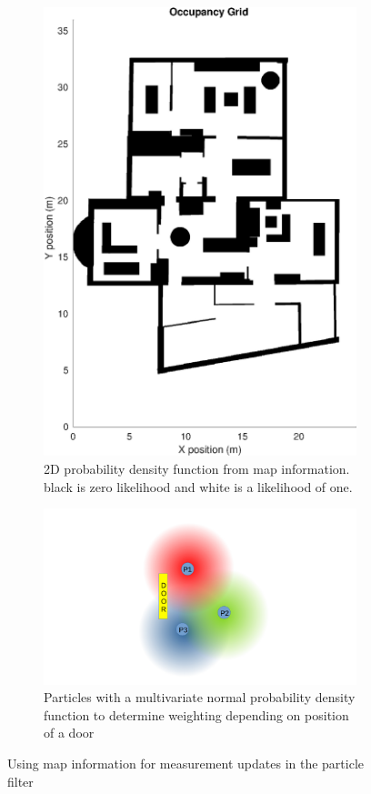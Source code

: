 \begin{enumerate}
	\begin{figure}[H]
		\centering
		\begin{subfigure}[t]{.4\textwidth}
			\centering
			\includegraphics[width=0.7\linewidth]{images/20201030_1157_pf_map_1}
			\caption{2D probability density function from map information. black is zero likelihood and white is a likelihood of one.}
			\label{fig:pf_walls}
		\end{subfigure} \quad
		\begin{subfigure}[t]{0.4\textwidth}
			\centering
			\includegraphics[trim=240 0 220 0, clip, width=0.7\linewidth]{images/pf_diagram}
			\caption{ Particles with a multivariate normal probability density function to determine weighting depending on position of a door}
			\label{fig:pfdiagram}
		\end{subfigure}
		\caption{Using map information for measurement updates in the particle filter}
		\label{fig:pf_meas_update}
	\end{figure}
	

\end{enumerate}
